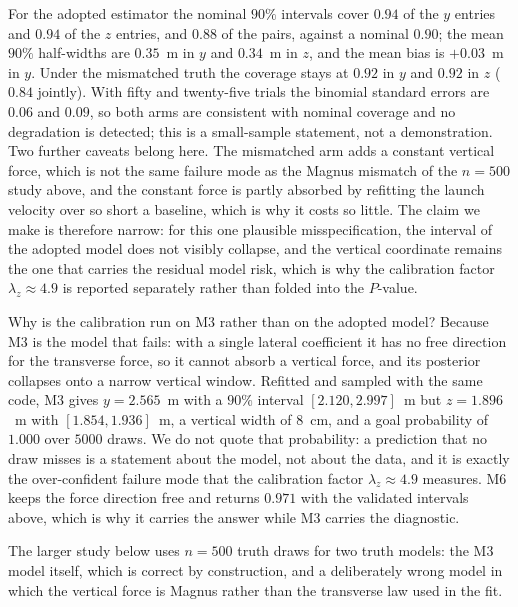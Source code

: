 For the adopted estimator the nominal $90\%$ intervals cover $0.94$ of the $y$
entries and $0.94$ of the $z$ entries, and $0.88$ of the pairs, against a
nominal $0.90$; the mean $90\%$ half-widths are $0.35$~m in $y$ and $0.34$~m in
$z$, and the mean bias is $+0.03$~m in $y$. Under the mismatched truth the
coverage stays at $0.92$ in $y$ and $0.92$ in $z$ ($0.84$ jointly). With
fifty and twenty-five trials the binomial standard errors are $0.06$ and $0.09$,
so both arms are consistent with nominal coverage and no degradation is detected;
this is a small-sample statement, not a demonstration. Two further caveats
belong here. The mismatched arm adds a constant vertical force, which is not the
same failure mode as the Magnus mismatch of the $n=500$ study above, and the
constant force is partly absorbed by refitting the launch velocity over so short
a baseline, which is why it costs so little. The claim we make is therefore
narrow: for this one plausible misspecification, the interval of the adopted
model does not visibly collapse, and the vertical coordinate remains the one that
carries the residual model risk, which is why the calibration factor
$\lambda_z\approx4.9$ is reported separately rather than folded into the
$P$-value.

Why is the calibration run on M3 rather than on the adopted model? Because M3 is
the model that fails: with a single lateral coefficient it has no free direction
for the transverse force, so it cannot absorb a vertical force, and its
posterior collapses onto a narrow vertical window. Refitted and sampled with the
same code, M3 gives $y=2.565$~m with a $90\%$ interval $[2.120,2.997]$~m but
$z=1.896$~m with $[1.854,1.936]$~m, a vertical width of $8$~cm, and a goal
probability of $1.000$ over $5000$ draws. We do not quote that probability: a
prediction that no draw misses is a statement about the model, not about the
data, and it is exactly the over-confident failure mode that the calibration
factor $\lambda_z\approx4.9$ measures. M6 keeps the force direction free and
returns $0.971$ with the validated intervals above, which is why it carries the
answer while M3 carries the diagnostic.

The larger study below uses $n=500$ truth draws for two truth models: the M3
model itself, which is correct by construction, and a deliberately wrong model in
which the vertical force is Magnus rather than the transverse law used in the
fit.

